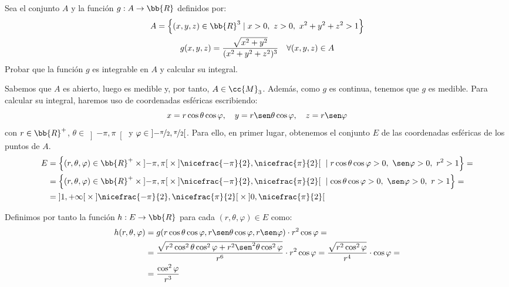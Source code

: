 \begin{ejercicio}
    Sea el conjunto $A$ y la función $g:A\to \bb{R}$ definidos por:
    \begin{gather*}
        A=\left\{(x,y,z)\in \bb{R}^3 \mid x>0,~z>0,~x^2+y^2+z^2> 1\right\}\\
        g(x,y,z) = \dfrac{\sqrt{x^2+y^2}}{(x^2+y^2+z^2)^{3}} \quad \forall (x,y,z)\in A
    \end{gather*}
    Probar que la función \( g \) es integrable en \( A \) y calcular su integral.

    Sabemos que $A$ es abierto, luego es medible y, por tanto, $A\in \cc{M}_3$. Además, como $g$ es continua, tenemos que $g$ es medible.
    Para calcular su integral, haremos uso de coordenadas esféricas escribiendo:
    \begin{equation*}
        x = r\cos\theta\cos\varphi, \quad y = r\sen\theta\cos\varphi, \quad z = r\sen\varphi
    \end{equation*}
    con $r\in \bb{R}^+$, $\theta\in \left]-\pi, \pi\right[$ y $\varphi\in \left]-\nicefrac{\pi}{2}, \nicefrac{\pi}{2}\right[$.
    Para ello, en primer lugar, obtenemos el conjunto $E$ de las coordenadas esféricas de los puntos de $A$.
    \begin{align*}
        E &= \left\{ (r, \theta, \varphi) \in \bb{R}^+\times \left]-\pi, \pi\right[ \times \left] \nicefrac{-\pi}{2},\nicefrac{\pi}{2} \right[ ~\mid r\cos\theta\cos\varphi > 0,~\sen\varphi > 0,~r^2 > 1 \right\} =\\
        &= \left\{ (r, \theta, \varphi) \in \bb{R}^+\times \left]-\pi, \pi\right[ \times \left] \nicefrac{-\pi}{2},\nicefrac{\pi}{2} \right[ ~\mid \cos\theta\cos\varphi > 0,~\sen\varphi > 0,~r > 1 \right\} =\\
        &= \left]1, +\infty\right[\times \left]\nicefrac{-\pi}{2}, \nicefrac{\pi}{2}\right[ \times \left]0, \nicefrac{\pi}{2}\right[
    \end{align*}

    Definimos por tanto la función $h: E \to \bb{R}$ para cada $(r, \theta, \varphi) \in E$ como:
    \begin{align*}
        h(r, \theta, \varphi) &=g(r\cos\theta\cos\varphi, r\sen\theta\cos\varphi, r\sen\varphi)\cdot r^2\cos\varphi =\\
        &= \dfrac{\sqrt{r^2\cos^2\theta\cos^2\varphi + r^2\sen^2\theta\cos^2\varphi}}{r^6} \cdot r^2\cos\varphi = \dfrac{\sqrt{r^2\cos^2\varphi}}{r^4}\cdot \cos\varphi =\\&= \dfrac{\cos^2\varphi}{r^3}
    \end{align*}


\end{ejercicio}

